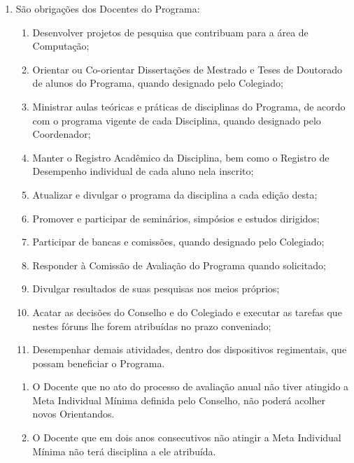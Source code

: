 \documentclass{article}
\newcommand{\grupoMenor}{Colegiado\xspace}
\newcommand{\grupoMaior}{Conselho\xspace}
\begin{document}
\begin{enumerate}
\begin{enumerate}[label=\Roman*]
	\end{enumerate}

	\item São obrigações dos Docentes do Programa:
	\begin{enumerate}[label=\Roman*]
		\item 	Desenvolver projetos de pesquisa que contribuam para a área de Computação;
		\item	Orientar ou Co-orientar Dissertações de Mestrado e Teses de Doutorado de alunos do Programa, quando designado pelo \grupoMenor;
		\item	Ministrar aulas teóricas e práticas de disciplinas do Programa, de acordo com o programa vigente de cada Disciplina, quando designado pelo Coordenador;
		\item	Manter o Registro Acadêmico da Disciplina, bem como o Registro de Desempenho individual de cada aluno nela inscrito;
		\item	Atualizar e divulgar o programa da disciplina a cada edição desta;
		\item	Promover e participar de seminários, simpósios e estudos dirigidos;
		\item	Participar de bancas e comissões, quando designado pelo \grupoMenor;
		\item	Responder à Comissão de Avaliação do Programa quando solicitado;
		\item	Divulgar resultados de suas pesquisas nos meios próprios;
		\item	Acatar as decisões do \grupoMaior e do \grupoMenor e executar as tarefas que nestes fóruns lhe forem atribuídas no prazo conveniado;
		\item	Desempenhar demais atividades, dentro dos dispositivos regimentais, que possam beneficiar o Programa.
	\end{enumerate}

	\begin{enumerate}
		\item O Docente que no ato do processo de avaliação anual não tiver atingido a Meta Individual Mínima definida pelo \grupoMaior, não poderá acolher novos Orientandos.

		\item O Docente que em dois anos consecutivos não atingir a Meta Individual Mínima não terá disciplina a ele atribuída.
	\end{enumerate}
\end{enumerate}
\end{document}
